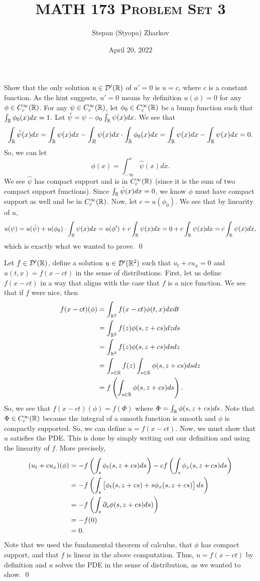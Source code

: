 \documentclass{article}
\title{\textsc{MATH 173 Problem Set 3}}
\author{Stepan (Styopa) Zharkov}
\date{April 20, 2022}
\newcommand{\Cc}{{C_c^\infty(\RR)}}
\renewcommand{\d}{\partial}
\begin{document}
\maketitle
{}Show that the only solution $u \in \mathcal{D}'(\mathbb{R})$ of $u' = 0$ is $u = c$, where $c$ is a constant function. \tri
\hop
\solution
As the hint suggests, $u' = 0$ means by definition $u(\phi) = 0$ for any $\phi \in C_c^\infty(\mathbb{R})$. For any $\psi \in \Cc$, let $\phi_0\in \Cc$ be a bump function such that $\int_{\mathbb{R}} \phi_0(x)dx = 1$. Let $\hat{\psi} = \psi - \phi_0\int_{\mathbb{R}}\psi(x)dx$. We see that 
\[\int_{\mathbb{R}} \hat{\psi}(x)dx = \int_{\mathbb{R}} \psi(x)dx -\int_R\psi(x)dx\cdot \int_{\mathbb{R}}\phi_0(x)dx =\int_{\mathbb{R}} \psi(x)dx-\int_{\mathbb{R}} \psi(x)dx = 0.\]
So, we can let 
\[\phi(x) = \int_{-\infty}^x \hat{\psi}(x) dx.\]
We see $\hat{\psi}$ has compact support and is in $\Cc$ (since it is the sum of two compact support functions). Since $\int_{\mathbb{R}} \hat{\psi}(x)dx = 0$, we know $\phi$ must have compact support as well and be in $\Cc$. Now, let $c = u(\phi_0)$. We see that by linearity of $u$,
\[u(\psi) = u(\hat{\psi}) + u(\phi_0)\cdot \int_{\mathbb{R}}\psi(x)dx = u(\phi') + c\int_{\mathbb{R}}\psi(x)dx =0+  c\int_{\mathbb{R}}\psi(x)dx=c\int_{\mathbb{R}}\psi(x)dx, \]
which is exactly what we wanted to prove. 
\qed


\newpage
{}Let $f \in \mathcal{D}'(\mathbb{R})$, define a solution $u \in \mathcal{D}'(\mathbb{R}^2)$ such that $u_t +cu_x = 0$ and $u(t,x) = f(x-ct)$ in the sense of distributions.
\tri
\hop
\solution
First, let us define $f(x-ct)$ in a way that aligns with the case that $f$ is a nice function. We see that if $f$ were nice, then
\begin{align*}
    f(x-ct)(\phi)&= \int_{\RR^2}f(x-ct)\phi(t,x)dxdt \\
    &= \int_{\RR^2}f(z)\phi(s,z+cs)dzds \\
    &= \int_{\RR^2}f(z)\phi(s,z+cs)dsdz \\
    & = \int_{z \in \RR} f(z) \int_{s \in \RR} \phi(s,z+cs)ds dz\\
    &= f\del{\int_{s \in \RR}\phi(s,z+cs)ds}. 
\end{align*}
So, we see that $f(x-ct)(\phi) = f(\Phi)$ where $\Phi = \int_{\mathbb{R}} \phi(s,z+cs)ds$. Note that $\Phi \in \Cc$ because the integral of a smooth function is smooth and $\phi$ is compactly supported. So, we can define $u = f(x-ct)$. 
\hop 
Now, we must show that $u$ satisfies the PDE. This is done by simply writing out our definition and using the linearity of $f$. More precisely, 
\begin{align*}
    (u_t + cu_x)(\phi) &= -f\del{\int_s \phi_t(s, z +cs) ds} -cf\del{\int_s \phi_x(s, z +cs) ds} \\
    &= -f\del{\int_s \sbr{\phi_t(s, z +cs) +s\phi_x(s, z +cs)} ds} \\
    & = -f\del{\int_s\d_s \phi(s,z+cs) ds)}\\
    &= -f(0) \\
    &= 0.
\end{align*} 
Note that we used the fundamental theorem of calculus, that $\phi$ has compact support, and that $f$ is linear in the above computation. 
\hop 
Thus, $u = f(x-ct)$ by definition and $u$ solves the PDE in the sense of distribution, as we wanted to show.
\qed
\end{document}
